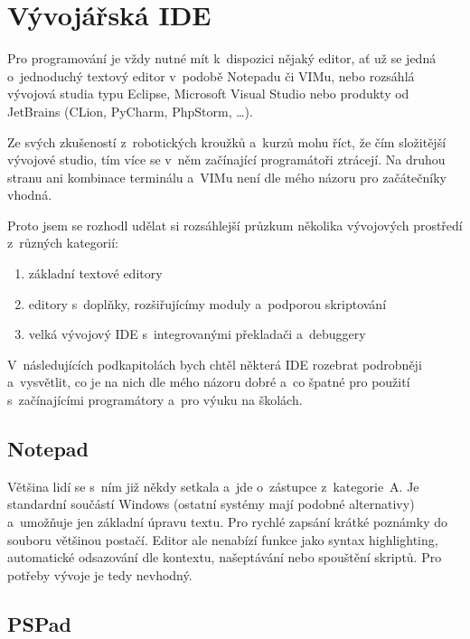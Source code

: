 \section{Vývojářská IDE}

Pro programování je vždy nutné mít k~dispozici nějaký editor, ať už se jedná o~jednoduchý textový editor v~podobě Notepadu či VIMu, nebo rozsáhlá vývojová studia typu Eclipse, Microsoft Visual Studio nebo produkty od JetBrains (CLion, PyCharm, PhpStorm, \dots).
% 
% 
%
%

Ze svých zkušeností z~robotických kroužků a~kurzů mohu říct, že čím složitější vývojové studio, tím více se v~něm začínající programátoři ztrácejí.
Na druhou stranu ani kombinace terminálu a~VIMu není dle mého názoru pro začátečníky vhodná.

Proto jsem se rozhodl udělat si rozsáhlejší průzkum několika vývojových prostředí z~různých kategorií: 

\begin{enumerate}[label=\Alph*)]
    \item základní textové editory
    \item editory s~doplňky, rozšiřujícímy moduly a~podporou skriptování
    \item velká vývojový IDE s~integrovanými překladači a~debuggery 
\end{enumerate}
V~následujících podkapitolách bych chtěl některá IDE rozebrat podrobněji a~vysvětlit, co je na nich dle mého názoru dobré a~co špatné pro použití s~začínajícími programátory a~pro výuku na školách.

\subsection{Notepad}


Většina lidí se s~ním již někdy setkala a~jde o~zástupce z~kategorie~A. 
Je standardní součástí Windows (ostatní systémy mají podobné alternativy) a~umožňuje jen základní úpravu textu.
Pro rychlé zapsání krátké poznámky do souboru většinou postačí.
Editor ale nenabízí funkce jako syntax highlighting, automatické odsazování dle kontextu, našeptávání nebo spouštění skriptů. 
Pro potřeby vývoje je tedy nevhodný. 

\subsection{PSPad}


